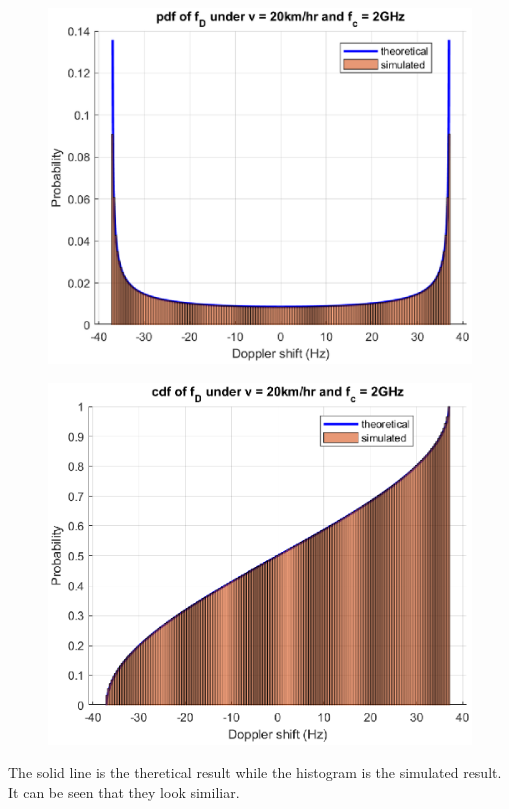 \begin{itemize}
\begin{figure}[H]
        \includegraphics[scale = 0.8]{d_pdf.eps}
    \end{figure}
    \begin{figure}[H]
        \centering
        \includegraphics[scale = 0.8]{d_cdf.eps}
    \end{figure}
    The solid line is the theretical result while the histogram is the simulated result. It can be seen that 
    they look similiar.
\end{itemize}